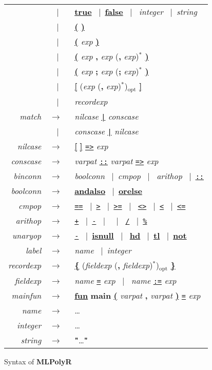 \documentclass{article}
\newcommand{\nt}[1]{{\it #1}}
\newcommand{\tl}[1]{{\underline{\bf #1}}}
\newcommand{\nutl}[1]{{\bf #1}}
\newcommand{\ttl}[1]{{\underline{\tt #1}}}
\newcommand{\ar}{$\rightarrow$\ }
\newcommand{\vb}{~$|$~}
\newcommand{\seq}[1]{{#1}$^{*}$}
\newcommand{\opt}[1]{{#1}$_{\mathrm{opt}}$}
\begin{document}
\begin{figure}
\begin{center}
\begin{tabular}{rcl}
                   &\vb& \tl{true} \vb \tl{false} \vb
                         \nt{integer} \vb \nt{string} \\
                   &\vb& \tl{(} \tl{)} \\
                   &\vb& \tl{(} \nt{exp} \tl{)} \\
                   &\vb& \tl{(} \nt{exp} \nutl{,} \nt{exp}
                                \seq{(\nutl{,} \nt{exp})} \tl{)} \\
                   &\vb& \tl{(} \nt{exp} \nutl{;} \nt{exp}
                                \seq{(\nutl{;} \nt{exp})} \tl{)} \\
                   &\vb& \tl{[} \opt{(\nt{exp} \seq{(\nutl{,} \nt{exp})})}
                         \tl{]} \\
                   &\vb& \nt{recordexp} \\
\nt{match}         &\ar& \nt{nilcase} \ttl{|} \nt{conscase} \\
                   &\vb& \nt{conscase} \ttl{|} \nt{nilcase} \\
\nt{nilcase}       &\ar& \tl{[} \tl{]} \ttl{=>} \nt{exp} \\
\nt{conscase}      &\ar& \nt{varpat} \ttl{::} \nt{varpat} \ttl{=>} \nt{exp} \\
\nt{binconn}       &\ar& \nt{boolconn} \vb \nt{cmpop} \vb
                         \nt{arithop} \vb \ttl{::} \\
\nt{boolconn}      &\ar& \tl{andalso} \vb \tl{orelse} \\
\nt{cmpop}         &\ar& \ttl{==} \vb \ttl{>} \vb \ttl{>=} \vb
                         \ttl{<>} \vb \ttl{<} \vb \ttl{<=} \\
\nt{arithop}       &\ar& \ttl{+} \vb \ttl{-} \vb \ttl{*} \vb
                         \ttl{/} \vb \ttl{\%} \\
\nt{unaryop}       &\ar& \ttl{-} \vb \tl{isnull} \vb
                         \tl{hd} \vb \tl{tl} \vb \tl{not} \\
\nt{label}         &\ar& \nt{name} \vb \nt{integer} \\
\nt{recordexp}     &\ar& \tl{\{} \opt{(\nt{fieldexp}
                                       \seq{(\nutl{,} \nt{fieldexp})})}
                         \tl{\}} \\
\nt{fieldexp}      &\ar& \nt{name} \ttl{=} \nt{exp} \vb
                         \nt{name} \ttl{:=} \nt{exp} \\
\nt{mainfun}       &\ar& \tl{fun} \nutl{main}
                                \tl{(} \nt{varpat} \nutl{,} \nt{varpat} \tl{)}
                         \ttl{=} \nt{exp} \\
\nt{name}          &\ar& \ldots \\
\nt{integer}       &\ar& \ldots \\
\nt{string}        &\ar& \nutl{"}\ldots\nutl{"}
\end{tabular}
\end{center}
\caption{Syntax of {\bf MLPolyR}}
\label{fig:syntax}
\end{figure}
\end{document}
